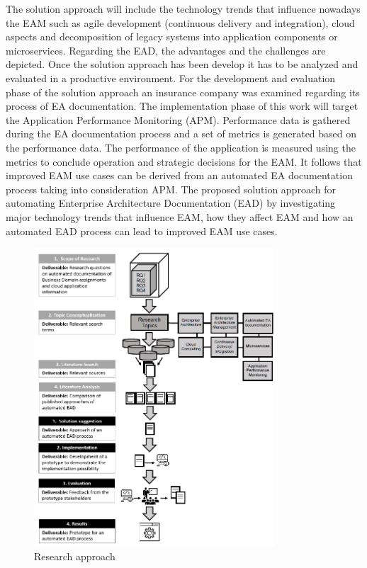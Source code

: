 The solution approach will include the technology trends that influence nowadays the EAM such as agile development (continuous delivery and integration), cloud aspects and decomposition of legacy systems into application components or microservices. Regarding the EAD, the advantages and the challenges are depicted. Once the solution approach has been develop it has to be analyzed and evaluated in a productive environment. For the development and evaluation phase of the solution approach an insurance company was examined regarding its process of EA documentation. The implementation phase of this work will target the Application Performance Monitoring (APM). Performance data is gathered during the EA documentation process and a set of metrics is generated based on the performance data. The performance of the application is measured using the metrics to conclude operation and strategic decisions for the EAM. It follows that improved EAM use cases can be derived from an automated EA documentation process taking into consideration APM. The proposed solution approach for automating Enterprise Architecture Documentation (EAD) by investigating major technology trends that influence EAM, how they affect EAM and how an automated EAD process can lead to improved EAM use cases.
\begin{figure}[htpb]
  \centering
  \includegraphics[width=0.8\textwidth]{figures/approach.PNG}
  \caption{Research approach~\parencite{Corpancho Villasana 2018}}
  \label{fig:research-approach}
\end{figure}